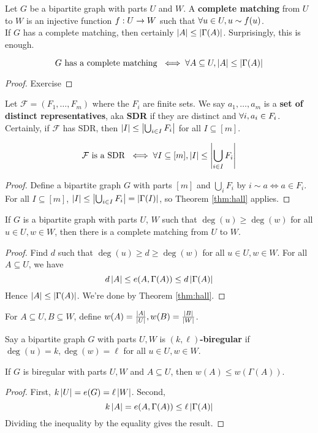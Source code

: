 \documentclass{article}
\begin{document}
Let $G$ be a bipartite graph with parts $U$ and $W$. A {\bf complete matching} from $U$ to $W$ is an injective function $f : U \rightarrow W$ such that $\forall u \in U, u \sim f(u)$. \\
If $G$ has a complete matching, then certainly $\left\lvert A\right\rvert \le \left\lvert \Gamma(A)\right\rvert$. Surprisingly, this is enough.

\begin{thm}\label{thm:hall}
  $$G \text{ has a complete matching } \iff \forall A \subseteq U, \left\lvert A\right\rvert \le \left\lvert \Gamma(A)\right\rvert$$
\end{thm}
\begin{proof}
  Exercise
\end{proof}

Let $\mathcal F = (F_1, \dots, F_m)$ where the $F_i$ are finite sets. We say $a_1, \dots, a_m$ is a {\bf set of distinct representatives}, aka {\bf SDR} if they are distinct and $\forall i, a_i \in F_i$. Certainly, if $\mathcal F$ has SDR, then $\left\lvert I\right\rvert \le \left\lvert \bigcup_{i \in I} F_i\right\rvert$ for all $I \subseteq [m]$.

\begin{thm}
  $$\mathcal F \text{ is a SDR } \iff \forall I \subseteq [m], \left\lvert I\right\rvert \le \left\lvert \bigcup_{i \in I} F_i\right\rvert$$
\end{thm}
\begin{proof}
  Define a bipartite graph $G$ with parts $[m]$ and $\bigcup_i F_i$ by $i \sim a \iff a \in F_i$. For all $I \subseteq [m]$, $\left\lvert I\right\rvert \le \left\lvert \bigcup_{i \in I} F_i\right\rvert = \left\lvert \Gamma(I)\right\rvert$, so Theorem \ref{thm:hall} applies.
\end{proof}

\begin{thm}
  If $G$ is a bipartite graph with parts $U$, $W$ such that $\deg(u) \ge \deg(w)$ for all $u \in U, w \in W$, then there is a complete matching from $U$ to $W$.
\end{thm}
\begin{proof}
  Find $d$ such that $\deg(u) \ge d \ge \deg(w)$ for all $u \in U, w \in W$. For all $A \subseteq U$, we have
  $$d\left\lvert A\right\rvert \le e(A, \Gamma(A)) \le d\left\lvert \Gamma(A)\right\rvert$$
  Hence $\left\lvert A\right\rvert \le \left\lvert \Gamma(A)\right\rvert$. We're done by Theorem \ref{thm:hall}.
\end{proof}

For $A \subseteq U, B \subseteq W$, define $w(A) = \frac{\left\lvert A\right\rvert}{\left\lvert U\right\rvert}, w(B) = \frac{\left\lvert B\right\rvert}{\left\lvert W\right\rvert}$.

Say a bipartite graph $G$ with parts $U, W$ is {\bf $(k, \ell)$-biregular} if
$\deg(u) = k, \deg(w) = \ell$ for all $u \in U, w \in W$.

\begin{lemma}
  If $G$ is biregular with parts $U, W$ and $A \subseteq U$, then $w(A) \le w(\Gamma(A))$.
\end{lemma}
\begin{proof}
  First, $k\left\lvert U\right\rvert = e(G) = \ell\left\lvert W\right\rvert$. Second,
  $$k\left\lvert A\right\rvert = e(A, \Gamma(A)) \le \ell\left\lvert \Gamma(A)\right\rvert$$
  Dividing the inequality by the equality gives the result.
\end{proof}

\newlec

\printindex
\end{document}
